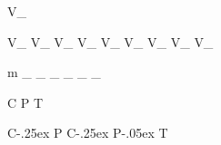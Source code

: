 
\newmathsymbol{\SigEff}{\varepsilon_{\Sig}}
\newmathsymbol{\BkgEff}{\varepsilon_{\Bkg}}

\newcommand{\crosssect}[1]{\ensuremath{\sigma\left(#1\right)}\xspace}
\newcommand{\crosssectinline}[1]{\ensuremath{\sigma(#1)}\xspace}


\newmathsymbol{\VCKM}             {V_{}}

\newmathsymbol{\Vud}              {V_{\uquark\dquark}}
\newmathsymbol{\Vcd}              {V_{\cquark\dquark}}
\newmathsymbol{\Vtd}              {V_{\tquark\dquark}}
\newmathsymbol{\Vus}              {V_{\uquark\squark}}
\newmathsymbol{\Vcs}              {V_{\cquark\squark}}
\newmathsymbol{\Vts}              {V_{\tquark\squark}}
\newmathsymbol{\Vub}              {V_{\uquark\bquark}}
\newmathsymbol{\Vcb}              {V_{\cquark\bquark}}
\newmathsymbol{\Vtb}              {V_{\tquark\bquark}}

\newmathsymbol{\DM}       {\Delta m}
\newmathsymbol{\DMs}      {\DM_{\squark}}
\newmathsymbol{\DMd}      {\DM_{\dquark}}
\newmathsymbol{\DG}       {\Delta\Gamma}
\newmathsymbol{\DGs}      {\DG_{\squark}}
\newmathsymbol{\DGd}      {\DG_{\dquark}}
\newmathsymbol{\Gs}       {\Gamma_{\squark}}
\newmathsymbol{\Gd}       {\Gamma_{\dquark}}


\newmathsymbol{\CSym}               {C}
\newmathsymbol{\PSym}               {P}
\newmathsymbol{\TSym}               {T}

\newmathsymbol{\CP}               {C\kern-.25ex P}
\newmathsymbol{\CPHyperref}       {\texorpdfstring{\CP}{CP}}
\newmathsymbol{\CPbfsf}           {\mathbfsfit{\CP}}
\newmathsymbol{\CPbfsfHyperref}   {\texorpdfstring{\CPbfsf}{CP}}
\newmathsymbol{\CPT}              {C\kern-.25ex P\kern-.05ex T}
\newmathsymbol{\CPAsymmetry}      {\Asym{\CP}{}}

